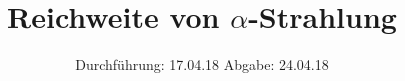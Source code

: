 

\subject{701}
\title{Reichweite von \texorpdfstring{$\alpha$}{alpha}-Strahlung}
\date{%
  Durchführung: 17.04.18
  \hspace{3em}
  Abgabe: 24.04.18
}



\maketitle
\thispagestyle{empty}
\tableofcontents
\newpage







\printbibliography{}


